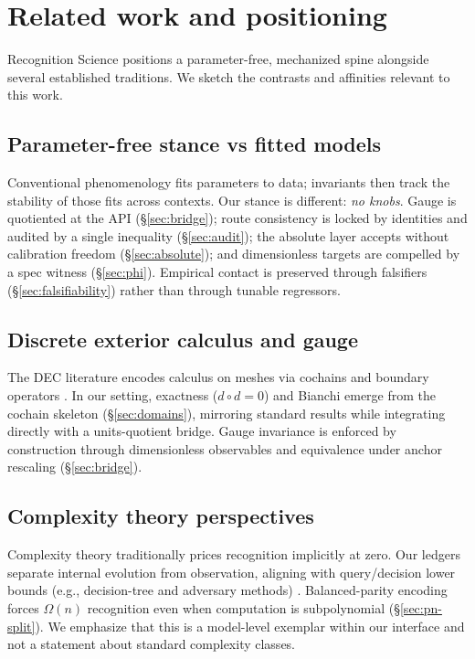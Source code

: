 \documentclass[11pt,a4paper,twoside]{article}
\numberwithin{equation}{section}
\theoremstyle{customthm}
\theoremstyle{customdef}
\theoremstyle{customrem}
\begin{document}
\section{Related work and positioning}\label{sec:related}

Recognition Science positions a parameter-free, mechanized spine alongside several established traditions. We sketch the contrasts and affinities relevant to this work.

\subsection{Parameter-free stance vs fitted models}\label{subsec:related-params}

Conventional phenomenology fits parameters to data; invariants then track the stability of those fits across contexts. Our stance is different: \emph{no knobs}. Gauge is quotiented at the API (\S\ref{sec:bridge}); route consistency is locked by identities and audited by a single inequality (\S\ref{sec:audit}); the absolute layer accepts without calibration freedom (\S\ref{sec:absolute}); and dimensionless targets are compelled by a spec witness (\S\ref{sec:phi}). Empirical contact is preserved through falsifiers (\S\ref{sec:falsifiability}) rather than through tunable regressors.

\subsection{Discrete exterior calculus and gauge}\label{subsec:related-dec}

The DEC literature encodes calculus on meshes via cochains and boundary operators \citep{Hirani2003,ArnoldFalkWinther2006,Desbrun2008}. In our setting, exactness (\(d\circ d=0\)) and Bianchi emerge from the cochain skeleton (\S\ref{sec:domains}), mirroring standard results while integrating directly with a units-quotient bridge. Gauge invariance is enforced by construction through dimensionless observables and equivalence under anchor rescaling (\S\ref{sec:bridge}).

\subsection{Complexity theory perspectives}\label{subsec:related-complexity}

Complexity theory traditionally prices recognition implicitly at zero. Our ledgers separate internal evolution from observation, aligning with query/decision lower bounds (e.g., decision-tree and adversary methods) \citep{NisanSzegedy1994,Ambainis2000}. Balanced-parity encoding forces \(\Omega(n)\) recognition even when computation is subpolynomial (\S\ref{sec:pn-split}). We emphasize that this is a model-level exemplar within our interface and not a statement about standard complexity classes.
\end{document}
